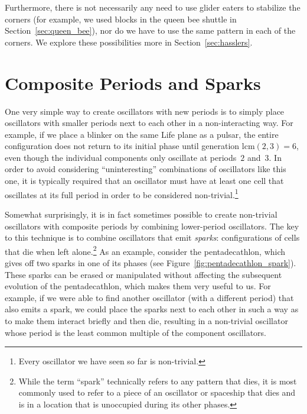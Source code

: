 Furthermore, there is not necessarily any need to use glider eaters to stabilize the corners (for example, we used blocks in the queen bee shuttle in Section~\ref{sec:queen_bee}), nor do we have to use the same pattern in each of the corners. We explore these possibilities more in Section~\ref{sec:hasslers}.


\section{Composite Periods and Sparks}\label{sec:composite_periods}

One very simple way to create oscillators with new periods is to simply place oscillators with smaller periods next to each other in a non-interacting way. For example, if we place a blinker on the same Life plane as a pulsar, the entire configuration does not return to its initial phase until generation $\mathrm{lcm}(2,3) = 6$, even though the individual components only oscillate at periods~$2$ and~$3$. In order to avoid considering ``uninteresting'' combinations of oscillators like this one, it is typically required that an oscillator must have at least one cell that oscillates at its full period in order to be considered non-trivial.\footnote{Every oscillator we have seen so far is non-trivial.}

Somewhat surprisingly, it is in fact sometimes possible to create non-trivial oscillators with composite periods by combining lower-period oscillators. The key to this technique is to combine oscillators that emit \emph{sparks}: configurations of cells that die when left alone.\footnote{While the term ``spark'' technically refers to any pattern that dies, it is most commonly used to refer to a piece of an oscillator or spaceship that dies and is in a location that is unoccupied during its other phases.} As an example, consider the pentadecathlon, which gives off two sparks in one of its phases (see Figure~\ref{fig:pentadecathlon_spark}). These sparks can be erased or manipulated without affecting the subsequent evolution of the pentadecathlon, which makes them very useful to us. For example, if we were able to find another oscillator (with a different period) that also emits a spark, we could place the sparks next to each other in such a way as to make them interact briefly and then die, resulting in a non-trivial oscillator whose period is the least common multiple of the component oscillators.


